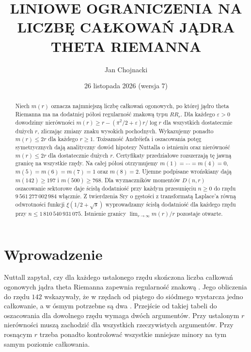 \documentclass[11pt,a4paper,reqno]{amsart}
\title[LICZBA CAŁKOWAŃ JĄDRA THETA RIEMANNA]{LINIOWE OGRANICZENIA NA LICZBĘ CAŁKOWAŃ JĄDRA THETA RIEMANNA}
\author{Jan Chojnacki}
\date{26 listopada 2026 (wersja 7)}
\numberwithin{equation}{section}
\begin{document}
\begin{abstract}

Niech \(m(r)\) oznacza najmniejszą liczbę całkowań ogonowych, po której jądro theta Riemanna ma na dodatniej półosi regularność znakową typu \(RR_r\). Dla każdego \(\varepsilon>0\) dowodzimy nierówności \(m(r)\ge r-(\pi^2/2+\varepsilon)r/\log r\) dla wszystkich dostatecznie dużych \(r\), zliczając zmiany znaku wysokich pochodnych. Wykazujemy ponadto \(m(r)\le2r\) dla każdego \(r\ge1\). Tożsamość Andréiefa i oszacowania potęg symetrycznych dają analityczny dowód hipotezy Nuttalla o istnieniu oraz nierówność \(m(r)\le2r\) dla dostatecznie dużych \(r\). Certyfikaty przedziałowe rozszerzają tę jawną granicę na wszystkie rzędy. Na całej półosi otrzymujemy \(m(1)=\cdots=m(4)=0\), \(m(5)=m(6)=m(7)=1\) oraz \(m(8)=2\). Ujemne podpisane wrońskiany dają \(m(142)\ge197\) i \(m(500)\ge768\). Dla wyznaczników momentów \(D(n,r)\) oszacowanie sektorowe daje ścisłą dodatniość przy każdym przesunięciu \(n\ge0\) do rzędu \(9\,561\,277\,002\,984\) włącznie. Z twierdzenia Sry o gęstości z transformatą Laplace’a równą odwrotności funkcji \(\xi(1/2+\sqrt{s})\) wyprowadzamy ścisłą dodatniość dla każdego rzędu przy \(n\le1\,810\,540\,931\,075\). Istnienie granicy \(\lim_{r\to\infty}m(r)/r\) pozostaje otwarte.

\end{abstract}

\maketitle

\section{Wprowadzenie}\label{sec:intro}


Nuttall zapytał, czy dla każdego ustalonego rzędu skończona liczba całkowań ogonowych jądra theta Riemanna zapewnia regularność znakową \cite[hipoteza~1]{nuttall}. Jego obliczenia do rzędu \(142\) wskazywały, że w rzędach od piątego do siódmego wystarcza jedno całkowanie, a w ósmym potrzebne są dwa \cite[\S4.7]{nuttall}. Przejście od takiej tabeli do oszacowania dla dowolnego rzędu wymaga dwóch argumentów. Przy ustalonym \(r\) nierówności muszą zachodzić dla wszystkich rzeczywistych argumentów. Przy rosnącym \(r\) trzeba ponadto kontrolować wszystkie mniejsze minory na tym samym poziomie całkowania.
\end{document}
